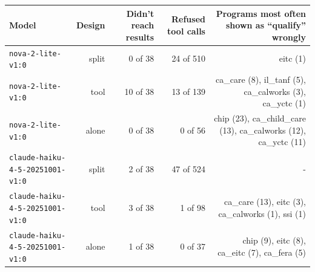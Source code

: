 \begin{tabular}{lrrrr}
\toprule
Model & Design & Didn't reach results & Refused tool calls & Programs most often shown as ``qualify'' wrongly \\
\midrule
\texttt{nova-2-lite-v1:0} & split & 0 of 38 & 24 of 510 & eitc (1) \\
\texttt{nova-2-lite-v1:0} & tool & 10 of 38 & 13 of 139 & ca\_care (8), il\_tanf (5), ca\_calworks (3), ca\_yctc (1) \\
\texttt{nova-2-lite-v1:0} & alone & 0 of 38 & 0 of 56 & chip (23), ca\_child\_care (13), ca\_calworks (12), ca\_yctc (11) \\
\texttt{claude-haiku-4-5-20251001-v1:0} & split & 2 of 38 & 47 of 524 & - \\
\texttt{claude-haiku-4-5-20251001-v1:0} & tool & 3 of 38 & 1 of 98 & ca\_care (13), eitc (3), ca\_calworks (1), ssi (1) \\
\texttt{claude-haiku-4-5-20251001-v1:0} & alone & 1 of 38 & 0 of 37 & chip (9), eitc (8), ca\_eitc (7), ca\_fera (5) \\
\bottomrule
\end{tabular}
